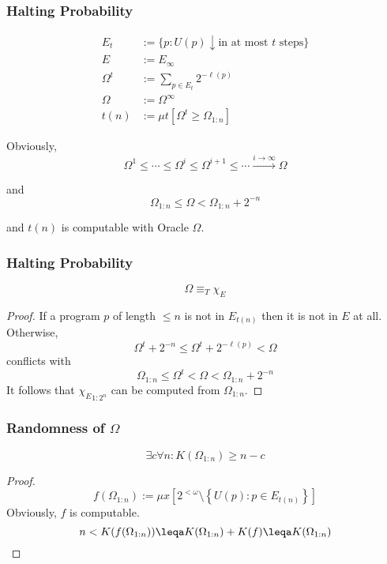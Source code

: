 \documentclass[UTF8,aspectratio=43,11pt,colorlinks,compress,openany]{beamer}%
\begin{document}
\begin{frame}\frametitle{Halting Probability}
\setlength\abovedisplayskip{0pt}
\setlength\belowdisplayskip{0pt}
	\begin{definition}
		\begin{align*}
		E_t &:=\big\{p: U(p)\downarrow \text{in at most $t$ steps}\big\}\\
		E &:=E_\infty\\
		\Omega^t &:=\sum\limits_{p\in E_t}2^{-\ell(p)}\\
		\Omega &:=\Omega^\infty\\
		t(n) &:=\mu t[\Omega^t\geq\Omega_{1:n}]
		\end{align*}
	\end{definition}
	Obviously,\[\Omega^1\leq\cdots\leq\Omega^i\leq\Omega^{i+1}\leq\cdots\xrightarrow{i\to\infty}\Omega\]
	
	and \[\Omega_{1:n}\leq\Omega<\Omega_{1:n}+2^{-n}\]
	
	and $t(n)$ is computable with Oracle $\Omega$.
\end{frame}

\begin{frame}\frametitle{Halting Probability}
\setlength\abovedisplayskip{0pt}
\setlength\belowdisplayskip{0pt}
	\begin{lemma}
		\[\Omega\equiv_T\chi_E\]
	\end{lemma}
	\begin{proof}
		If a program $p$ of length $\leq n$ is not in $E_{t(n)}$ then it is not in $E$ at all. Otherwise, \[\Omega^t+2^{-n}\leq\Omega^t+2^{-\ell(p)}<\Omega\] conflicts with \[\Omega_{1:n}\leq\Omega^t<\Omega<\Omega_{1:n}+2^{-n}\]
		It follows that ${\chi_E}_{1:2^n}$ can be computed from $\Omega_{1:n}$.
	\end{proof}
\end{frame}

\begin{frame}\frametitle{Randomness of $\Omega$}
	\begin{theorem}
		\[\exists c\forall n: K(\Omega_{1:n})\geq n-c\]
	\end{theorem}
	\begin{proof}
		\[f(\Omega_{1:n}):=\mu x\left[2^{<\omega}\setminus\left\{U(p): p\in E_{t(n)}\right\}\right]\]
		Obviously, $f$ is computable.
		\[n<K(f(\Omega_{1:n}))\leqa K(\Omega_{1:n})+K(f)\leqa K(\Omega_{1:n})\]
	\end{proof}
\end{frame}
\end{document}
